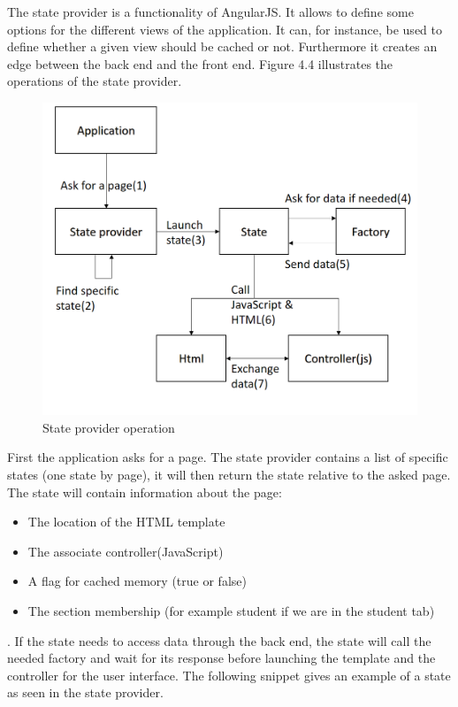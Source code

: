 \documentclass{eplmastersthesis}
\begin{document}
The state provider is a functionality of AngularJS. It allows to define some options for the different views of the application. It can, for instance, be used to define whether a given view should be cached or not. Furthermore it creates an edge between the back end and the front end. Figure 4.4 illustrates the operations of the state provider. 
\begin{figure}[H]
\centering
\includegraphics[scale = 0.3]{Images/stateProvider_arch.png}
\caption{State provider operation}
\end{figure}
First the application asks for a page. The state provider contains a list of specific states (one state by page), it will then return the state relative to the asked page. The state will contain information about the page:
\begin{itemize}
\item The location of the HTML template
\item The associate controller(JavaScript)
\item A flag for cached memory (true or false)
\item The section membership (for example student if we are in the student tab)
\end{itemize}. If the state needs to access data through the back end, the state will call the needed factory and wait for its response before launching the template and the controller for the user interface. The following snippet gives an example of a state as seen in the state provider.
\end{document}
